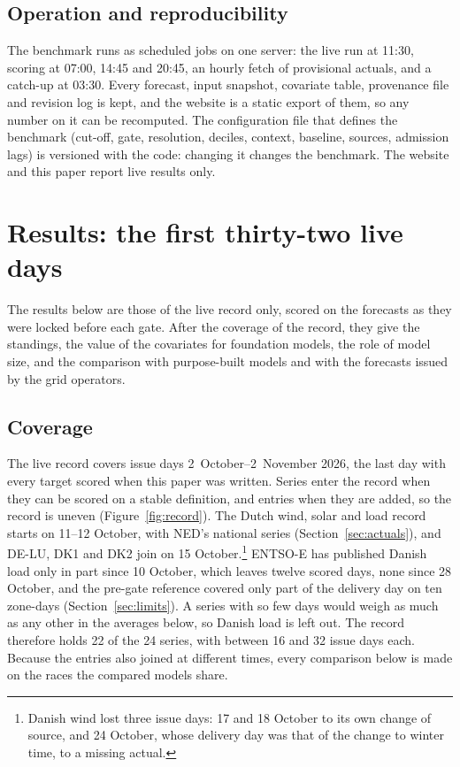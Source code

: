 \documentclass[11pt,a4paper]{article}
\begin{document}
\subsection{Operation and reproducibility}

The benchmark runs as scheduled jobs on one server: the live run at 11:30, scoring at
07:00, 14:45 and 20:45, an hourly fetch of provisional actuals, and a catch-up at 03:30. Every forecast, input
snapshot, covariate table, provenance file and revision log is kept, and the website is a static export of them, so
any number on it can be recomputed. The configuration file that defines the benchmark (cut-off, gate, resolution,
deciles, context, baseline, sources, admission lags) is versioned with the code: changing it changes
the benchmark. The website and this paper report live results only.

\section{Results: the first thirty-two live days}
\label{sec:results}

The results below are those of the live record only, scored on the forecasts as they were locked before each gate.
After the coverage of the record, they give the standings, the value of the covariates for foundation models, the
role of model size, and the comparison with purpose-built models and with the forecasts issued by the grid operators.

\subsection{Coverage}
\label{sec:coverage}

The live record covers issue days 2~October--2~November 2026, the last day with every target scored when this paper was
written. Series enter the record when they can be scored on a stable definition, and entries when they are added, so
the record is uneven (Figure~\ref{fig:record}). The Dutch wind, solar and load record starts on 11--12 October,
with NED's national series (Section~\ref{sec:actuals}), and DE-LU, DK1 and DK2 join on 15 October.\footnote{Danish
wind lost three issue days: 17 and 18 October to its own change of source, and 24 October, whose delivery day was that
of the change to winter time, to a missing actual.} ENTSO-E has published Danish load only in part since 10 October,
which leaves twelve scored days, none since 28 October, and the pre-gate reference covered only part of the delivery day on ten zone-days
(Section~\ref{sec:limits}). A series with so few days would weigh as much as any other in the averages below, so
Danish load is left out. The record therefore holds 22 of the 24 series, with between 16 and 32 issue days each.
Because the entries also joined at different times, every comparison below is made on the races the compared models
share.
\end{document}
